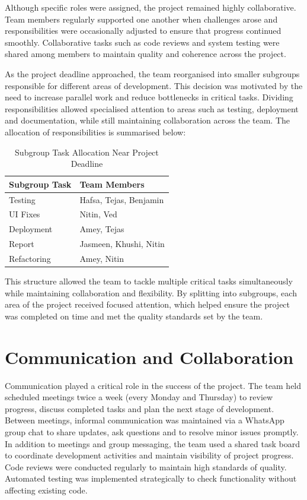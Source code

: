 Although specific roles were assigned, the project remained highly collaborative. Team members regularly supported one another when challenges arose and responsibilities were occasionally adjusted to ensure that progress continued smoothly. Collaborative tasks such as code reviews and system testing were shared among members to maintain quality and coherence across the project.

As the project deadline approached, the team reorganised into smaller subgroups responsible for different areas of development. This decision was motivated by the need to increase parallel work and reduce bottlenecks in critical tasks. Dividing responsibilities allowed specialised attention to areas such as testing, deployment and documentation, while still maintaining collaboration across the team. The allocation of responsibilities is summarised below:

\begin{table}[h]
\centering
\footnotesize
\caption{Subgroup Task Allocation Near Project Deadline}
\begin{tabularx}{\textwidth}{|p{4cm}|L|}
\hline
\textbf{Subgroup Task} & \textbf{Team Members} \\
\hline
Testing & Hafsa, Tejas, Benjamin \\
\hline
UI Fixes & Nitin, Ved \\
\hline
Deployment & Amey, Tejas \\
\hline
Report & Jasmeen, Khushi, Nitin \\
\hline
Refactoring & Amey, Nitin \\
\hline
\end{tabularx}
\label{tab:task-allocation}
\end{table}

This structure allowed the team to tackle multiple critical tasks simultaneously while maintaining collaboration and flexibility. By splitting into subgroups, each area of the project received focused attention, which helped ensure the project was completed on time and met the quality standards set by the team.

\section{Communication and Collaboration}
Communication played a critical role in the success of the project. The team held scheduled meetings twice a week (every Monday and Thursday) to review progress, discuss completed tasks and plan the next stage of development. Between meetings, informal communication was maintained via a WhatsApp group chat to share updates, ask questions and to resolve minor issues promptly.
In addition to meetings and group messaging, the team used a shared task board to coordinate development activities and maintain visibility of project progress. Code reviews were conducted regularly to maintain high standards of quality. Automated testing was implemented strategically to check functionality without affecting existing code.

